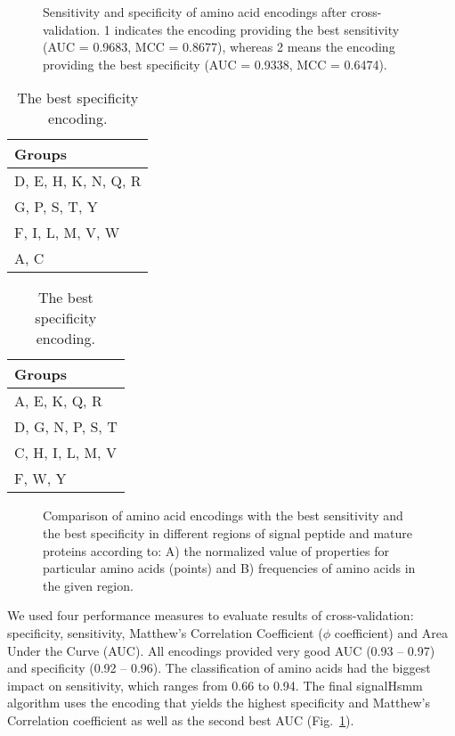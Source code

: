 \documentclass[10pt,letterpaper]{article}
\begin{document}
\begin{figure}[ht]\centering
\caption{Sensitivity and specificity of amino acid encodings after cross-validation. 1 indicates the encoding providing the best sensitivity (AUC = 0.9683, MCC = 0.8677), whereas 2 means the encoding providing the best specificity (AUC = 0.9338, MCC = 0.6474).}
\label{fig:cvres}
\end{figure}

\begin{table}[ht]
\small
\begin{minipage}{.5\linewidth} 
\centering
\caption{The best sensitivity (final) encoding.} 
\begin{tabular}{l}
  \toprule
Groups \\ 
  \midrule
D, E, H, K, N, Q, R \\ 
   \rowcolor[gray]{0.85}G, P, S, T, Y \\ 
  F, I, L, M, V, W \\ 
   \rowcolor[gray]{0.85}A, C \\ 
   \bottomrule
\end{tabular}
\label{tab:best}
\end{minipage}
\begin{minipage}{.5\linewidth} 
\centering
\caption{The best specificity encoding.} 
\begin{tabular}{l}
  \toprule
Groups \\ 
  \midrule
A, E, K, Q, R \\ 
   \rowcolor[gray]{0.85}D, G, N, P, S, T \\ 
  C, H, I, L, M, V \\ 
   \rowcolor[gray]{0.85}F, W, Y \\ 
   \bottomrule
\end{tabular}
\label{tab:worst}
\end{minipage}
\end{table}


\begin{figure}[ht]\centering
\caption{Comparison of amino acid encodings with the best sensitivity and the best
specificity in different regions of signal peptide and mature proteins according to: A) the normalized value of properties for particular amino acids (points) and B) frequencies of amino acids in the given region.}
\label{fig:enccomp}
\end{figure}

We used four performance measures to evaluate results of cross-validation: specificity, sensitivity, Matthew's Correlation Coefficient ($\phi$ coefficient) and Area Under the Curve (AUC). All encodings provided very good AUC (0.93 -- 0.97) and specificity (0.92 -- 0.96). The classification of amino acids had the biggest impact on sensitivity, which ranges from 0.66 to 0.94. The final signalHsmm algorithm uses the encoding that yields the highest specificity and Matthew's Correlation coefficient as well as the second best AUC (Fig.~\ref{fig:cvres}).
\end{document}
